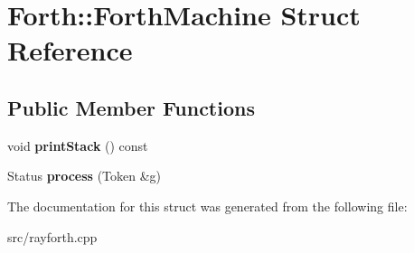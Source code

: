 \hypertarget{struct_forth_1_1_forth_machine}{\section{Forth\-:\-:Forth\-Machine Struct Reference}
\label{struct_forth_1_1_forth_machine}
}
\subsection*{Public Member Functions}
\begin{DoxyCompactItemize}
\item 
\hypertarget{struct_forth_1_1_forth_machine_ad6702638c4880ffdbc7cbfd4703060f4}{void {\bfseries print\-Stack} () const }\label{struct_forth_1_1_forth_machine_ad6702638c4880ffdbc7cbfd4703060f4}

\item 
\hypertarget{struct_forth_1_1_forth_machine_aa94a352b17c33615c1ab84abcb72e399}{Status {\bfseries process} (Token \&g)}\label{struct_forth_1_1_forth_machine_aa94a352b17c33615c1ab84abcb72e399}

\end{DoxyCompactItemize}


The documentation for this struct was generated from the following file\-:\begin{DoxyCompactItemize}
\item 
src/rayforth.\-cpp\end{DoxyCompactItemize}
